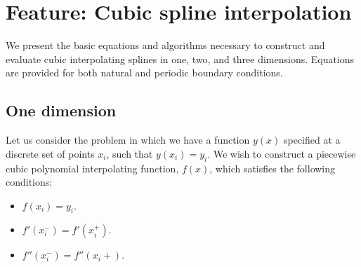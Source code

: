 %




\section{Feature: Cubic spline interpolation}

\newenvironment{DMatrix}{\begin{array}|{*{20}{c}}|}{\end{array}}
\newenvironment{MyMatrix}{\begin{array}({*{20}{c}})}{\end{array}}
\newenvironment{LMatrix}{\begin{array}({*{20}{l}})}{\end{array}}

We present the basic equations and algorithms necessary to
construct and evaluate cubic interpolating splines in one, two, and
three dimensions.  Equations are provided for both natural and
periodic boundary conditions.

\subsection{One dimension}
Let us consider the problem in which we have a function $y(x)$
specified at a discrete set of points $x_i$, such that $y(x_i) = y_i$.
We wish to construct a piecewise cubic polynomial interpolating
function, $f(x)$, which satisfies the following conditions:
\begin{itemize}
\item $f(x_i) = y_i$\:.
\item $f'(x_i^-) = f'(x_i^+)$\:.
\item $f''(x_i^-) = f''(x_i+)$\:.
\end{itemize}

